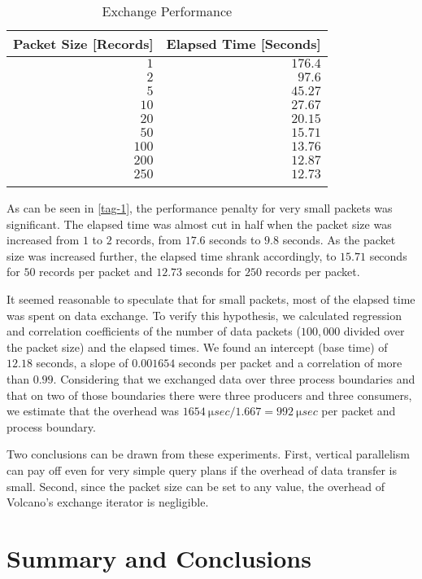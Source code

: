 \documentclass[a4paper,12pt,notitlepage,twoside,openright]{article}
\begin{document}
\begin{table}[hbtp]
  \centering
  \begin{tabu}{rr}
    \toprule{}
    Packet Size [Records] & Elapsed Time [Seconds]\\
    \midrule{}
    $1$ & $176.4$\\
    $2$ & $97.6$\\
    $5$ & $45.27$\\
    $10$ & $27.67$\\
    $20$ & $20.15$\\
    $50$ & $15.71$\\
    $100$ & $13.76$\\
    $200$ & $12.87$\\
    $250$ & $12.73$\\
    \bottomrule{}
  \end{tabu}
  \caption{Exchange Performance\label{tab-1}}
\end{table}

As can be seen in \autoref{tag-1}, the performance penalty
for very small packets was significant. The elapsed time
was almost cut in half when the packet size was increased
from $1$ to $2$ records, from $17.6$ seconds to $9.8$ seconds. As
the packet size was increased further, the elapsed time
shrank accordingly, to $15.71$ seconds for $50$ records per
packet and $12.73$ seconds for $250$ records per packet.

It seemed reasonable to speculate that for small packets,
most of the elapsed time was spent on data exchange.
To verify this hypothesis, we calculated regression and
correlation coefficients of the number of data packets
($100,000$ divided over the packet size) and the elapsed
times. We found an intercept (base time) of $12.18$ seconds,
a slope of $0.001654$ seconds per packet and a correlation
of more than $0.99$. Considering that we exchanged data
over three process boundaries and that on two of those
boundaries there were three producers and three consumers,
we estimate that the overhead was $\SI{1654}{\micro sec} / 1.667 = \SI{992}{\micro sec}$
per packet and process boundary.

Two conclusions can be drawn from these experiments.
First, vertical parallelism can pay off even for very
simple query plans if the overhead of data transfer is small.
Second, since the packet size can be set to any value, the
overhead of Volcano's exchange iterator is negligible.

\section{Summary and Conclusions}
\end{document}
